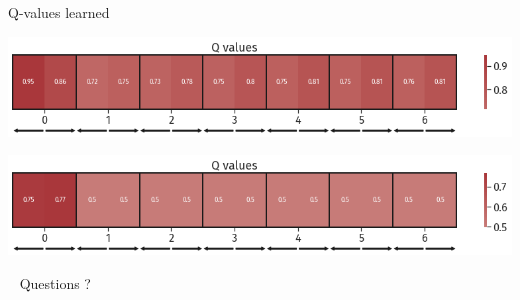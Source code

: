 \documentclass[bigger]{beamer}
\begin{document}
\begin{frame}[label={sec:org47cb14d}]{Q-values learned}
\begin{center}
\includegraphics[width=\textwidth]{img/DRL-q-values.png}
\end{center}
\begin{center}
\includegraphics[width=\textwidth]{img/DRL-q-values2.png}
\end{center}
\end{frame}
\begin{frame}[label={sec:org07950bc},standout]{~}
Questions ?
\end{frame}
\end{document}

